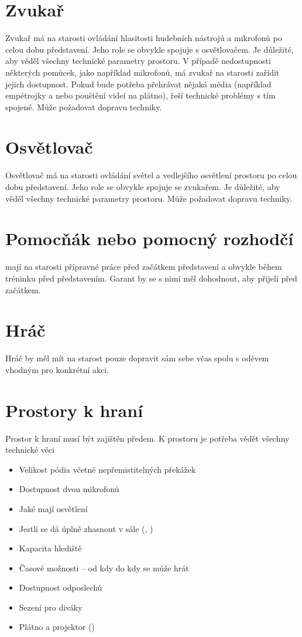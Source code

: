 \documentclass[main.tex]{subfiles}
\begin{document}
\section{Zvukař} Zvukař má na starosti ovládání hlasitosti hudebních nástrojů a mikrofonů po celou dobu představení. Jeho role se obvykle spojuje s osvětlovačem. Je důležité, aby věděl všechny technické parametry prostoru. 
V případě nedostupnosti některých pomůcek, jako například mikrofonů, má zvukař na starosti zařídit jejich dostupnost. 
Pokud bude potřeba přehrávat nějaká média (například empétrojky a nebo pouštění videí na plátno), řeší technické problémy s tím spojené. 
Může požadovat dopravu techniky. 
\section{Osvětlovač} Osvětlovač má na starosti ovládání světel a vedlejšího osvětlení prostoru po celou dobu představení. Jeho role se obvykle spojuje se zvukařem. Je důležité, aby věděl všechny technické parametry prostoru. 
Může požadovat dopravu techniky. 
\section{Pomocňák nebo pomocný rozhodčí}   mají na starosti přípravné práce před začátkem představení a obvykle během tréninku před představením. Garant by se s nimi měl dohodnout, aby přijeli před začátkem. 
\section{Hráč} Hráč by měl mít na starost pouze dopravit sám sebe včas spolu s oděvem vhodným pro konkrétní akci. 
\section{Prostory k hraní} Prostor k hraní musí být zajištěn předem. K prostoru je potřeba vědět všechny technické věci 
\begin{itemize}
\item Velikost pódia včetně nepřemistitelných překážek
\item Dostupnost dvou mikrofonů
\item Jaké mají osvětlení
\item Jestli se dá úplně zhasnout v sále (, )
\item Kapacita hlediště
\item Časové možnosti – od kdy do kdy se může hrát
\item Dostupnost odposlechů
\item Sezení pro diváky
\item Plátno a projektor ()
\end{itemize}
 
\end{document}
